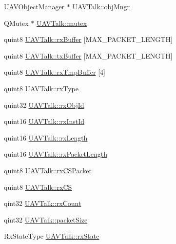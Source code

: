 \begin{DoxyCompactItemize}
\item 
\hyperlink{class_u_a_v_object_manager}{U\-A\-V\-Object\-Manager} $\ast$ \hyperlink{group___u_a_v_talk_plugin_ga096422f1ff46ea45de07a92c41827aa5}{U\-A\-V\-Talk\-::obj\-Mngr}
\item 
Q\-Mutex $\ast$ \hyperlink{group___u_a_v_talk_plugin_ga2dea39cdabf26ef85d0b26583e21e60b}{U\-A\-V\-Talk\-::mutex}
\item 
quint8 \hyperlink{group___u_a_v_talk_plugin_ga612e1b395a61ee81d90d8199ba789a86}{U\-A\-V\-Talk\-::rx\-Buffer} \mbox{[}M\-A\-X\-\_\-\-P\-A\-C\-K\-E\-T\-\_\-\-L\-E\-N\-G\-T\-H\mbox{]}
\item 
quint8 \hyperlink{group___u_a_v_talk_plugin_ga7f0eb8c42215b435a77b84d7ffdbbfc3}{U\-A\-V\-Talk\-::tx\-Buffer} \mbox{[}M\-A\-X\-\_\-\-P\-A\-C\-K\-E\-T\-\_\-\-L\-E\-N\-G\-T\-H\mbox{]}
\item 
quint8 \hyperlink{group___u_a_v_talk_plugin_ga94d59693bfbe92bf000ee85b559693e0}{U\-A\-V\-Talk\-::rx\-Tmp\-Buffer} \mbox{[}4\mbox{]}
\item 
quint8 \hyperlink{group___u_a_v_talk_plugin_ga59962a309157ed27efad61d5bf85f650}{U\-A\-V\-Talk\-::rx\-Type}
\item 
quint32 \hyperlink{group___u_a_v_talk_plugin_ga922e3ea36927c84023cfb0cf719c9aa0}{U\-A\-V\-Talk\-::rx\-Obj\-Id}
\item 
quint16 \hyperlink{group___u_a_v_talk_plugin_ga72761110b9b683dad5615619c9323674}{U\-A\-V\-Talk\-::rx\-Inst\-Id}
\item 
quint16 \hyperlink{group___u_a_v_talk_plugin_ga52cc4d0f063a520fcf7fc2a10254118b}{U\-A\-V\-Talk\-::rx\-Length}
\item 
quint16 \hyperlink{group___u_a_v_talk_plugin_ga8ce408e2fe258de7a15c77540055a81d}{U\-A\-V\-Talk\-::rx\-Packet\-Length}
\item 
quint8 \hyperlink{group___u_a_v_talk_plugin_gab6dc6fd77ce7d02c121d7c197dfdebd2}{U\-A\-V\-Talk\-::rx\-C\-S\-Packet}
\item 
quint8 \hyperlink{group___u_a_v_talk_plugin_gabfde70d24df43bcff2ab3c3da3f2444f}{U\-A\-V\-Talk\-::rx\-C\-S}
\item 
qint32 \hyperlink{group___u_a_v_talk_plugin_ga380dea6ca845f80612070ed17ea65655}{U\-A\-V\-Talk\-::rx\-Count}
\item 
qint32 \hyperlink{group___u_a_v_talk_plugin_gaa014be97504e5d24ac39f2808976685e}{U\-A\-V\-Talk\-::packet\-Size}
\item 
Rx\-State\-Type \hyperlink{group___u_a_v_talk_plugin_gacce7e3b2035887b09dce0fdbba0f1b58}{U\-A\-V\-Talk\-::rx\-State}

\end{DoxyCompactItemize}
